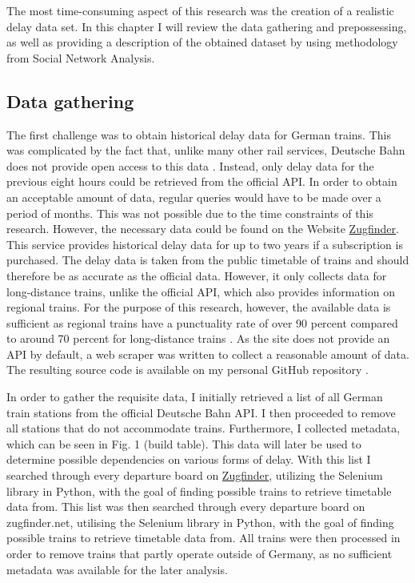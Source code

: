 \documentclass[12pt,a4paper]{article}
\begin{document}
The most time-consuming aspect of this research was the creation of a realistic delay data set. 
In this chapter I will review the data gathering and prepossessing, as well as providing a description of the obtained dataset by using methodology from Social Network Analysis.

\maketitle
\subsection{\label{sec:Gathering}Data gathering}

The first challenge was to obtain historical delay data for German trains. This was complicated by the fact that, unlike many other rail services, Deutsche Bahn does not provide open access to this data \citep[p.~5]{Spanninger2022}. 
Instead, only delay data for the previous eight hours could be retrieved from the official API. 
In order to obtain an acceptable amount of data, regular queries would have to be made over a period of months. This was not possible due to the time constraints of this research. 
However, the necessary data could be found on the Website \href{https://www.zugfinder.net/en/start}{Zugfinder}. This service provides historical delay data for up to two years if a subscription is purchased. 
The delay data is taken from the public timetable of trains and should therefore be as accurate as the official data. However, it only collects data for long-distance trains, unlike the official API, which also provides information on regional trains. 
For the purpose of this research, however, the available data is sufficient as regional trains have a punctuality rate of over 90 percent compared to around 70 percent for long-distance trains \citep{DBPunctuality2024}. 
As the site does not provide an API by default, a web scraper was written to collect a reasonable amount of data. The resulting source code is available on my personal GitHub repository \citep{repo}. 

In order to gather the requisite data, I initially retrieved a list of all German train stations from the official Deutsche Bahn API. 
I then proceeded to remove all stations that do not accommodate trains. Furthermore, I collected metadata, which can be seen in Fig. 1 (build table). 
This data will later be used to determine possible dependencies on various forms of delay. With this list I searched through every departure board on \href{https://www.zugfinder.net/en/start}{Zugfinder}, utilizing the Selenium library in Python, with the goal of finding possible trains to retrieve timetable data from. 
This list was then searched through every departure board on zugfinder.net, utilising the Selenium library in Python, with the goal of finding possible trains to retrieve timetable data from. 
All trains were then processed in order to remove trains that partly operate outside of Germany, as no sufficient metadata was available for the later analysis. 
\end{document}
